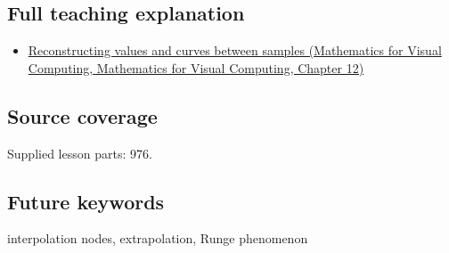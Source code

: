 \subsection{Full teaching explanation}\label{appendix-0c2a5f69851e-full-teaching-explanation}

\begin{itemize}
\tightlist
\item
  \href{../02-Mathematics-for-Visual-Computing/main.pdf\#nameddest=02-foundations-ii-ch028-reconstructing-values-and-curves-between-samples}{Reconstructing values and curves between samples (Mathematics for Visual Computing, Mathematics for Visual Computing, Chapter 12)}
\end{itemize}

\subsection{Source coverage}\label{appendix-0c2a5f69851e-source-coverage}

Supplied lesson parts: 976.

\subsection{Future keywords}\label{appendix-0c2a5f69851e-future-keywords}

interpolation nodes, extrapolation, Runge phenomenon
